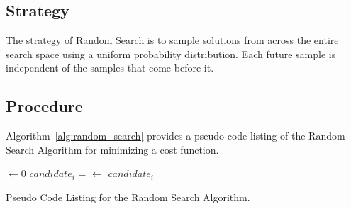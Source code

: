 \subsection{Strategy}
The strategy of Random Search is to sample solutions from across the entire search space using a uniform probability distribution. Each future sample is independent of the samples that come before it.

\subsection{Procedure}
Algorithm~\ref{alg:random_search} provides a pseudo-code listing of the Random Search Algorithm for minimizing a cost function.

\begin{algorithm}[ht]
	\SetLine
	\KwIn{\NumIterations, \ProblemSize, \SearchSpace}
	\KwOut{\Best}
	\Best $\leftarrow 0$\;
	 {
		$candidate_i$ = \RandomSolution{\ProblemSize, \SearchSpace}\;
		 {
			\Best $\leftarrow$ $candidate_i$\;
		}
	}
	\Return{\Best}\;
	\caption{Pseudo Code Listing for the Random Search Algorithm.}
	\label{alg:random_search}
\end{algorithm}

